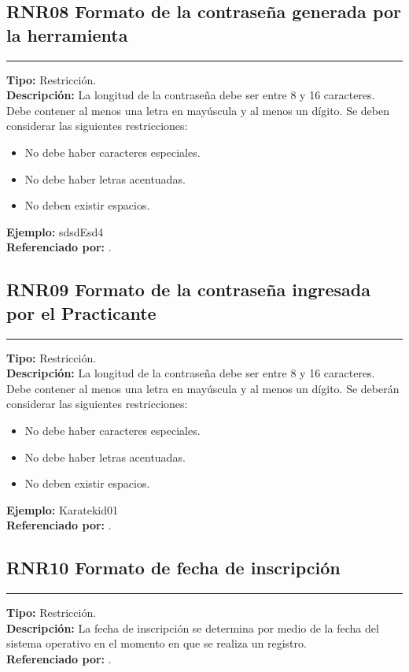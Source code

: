 \subsection{\normalsize{\textcolor[rgb]{0, 0, 0.545098}{RNR08 Formato de la contraseña generada por la herramienta}}}
\label{rn:RNR08}
\rule[3mm]{16.59cm}{0.1mm} \vspace{1mm}
\textbf{Tipo:} Restricción.\\
\textbf{Descripción:} La longitud de la contraseña debe ser entre 8 y 16 caracteres. Debe contener al menos una letra en mayúscula y al menos un dígito. 
Se deben considerar las siguientes restricciones: 
\begin{itemize} \itemsep1pt \parskip0pt 
	\item No debe haber caracteres especiales.
	\item No debe haber letras acentuadas.
	\item No deben existir espacios.
\end{itemize}
\textbf{Ejemplo:} sdsdEsd4\\
\textbf{Referenciado por:}  .\\

\subsection{\normalsize{\textcolor[rgb]{0, 0, 0.545098}{RNR09 Formato de la contraseña ingresada por el Practicante}}}
\label{rn:RNR09}
\rule[3mm]{16.59cm}{0.1mm} \vspace{1mm}
\textbf{Tipo:} Restricción.\\
\textbf{Descripción:} La longitud de la contraseña debe ser entre 8 y 16 caracteres. Debe contener al menos una letra en mayúscula y al menos un dígito. 
Se deberán considerar las siguientes restricciones: 
\begin{itemize} \itemsep1pt \parskip0pt 
	\item No debe haber caracteres especiales.
	\item No debe haber letras acentuadas.
	\item No deben existir espacios.
\end{itemize}
\textbf{Ejemplo:} Karatekid01\\
\textbf{Referenciado por:}  .\\

\subsection{\normalsize{\textcolor[rgb]{0, 0, 0.545098}{RNR10 Formato de fecha de inscripción}}}
\label{rn:RNR10}
\rule[3mm]{16.59cm}{0.1mm} \vspace{1mm}
\textbf{Tipo:} Restricción.\\
\textbf{Descripción:} La fecha de inscripción se determina por medio de la fecha del sistema operativo en el momento en que se realiza un registro. \\
\textbf{Referenciado por: }  .\\

